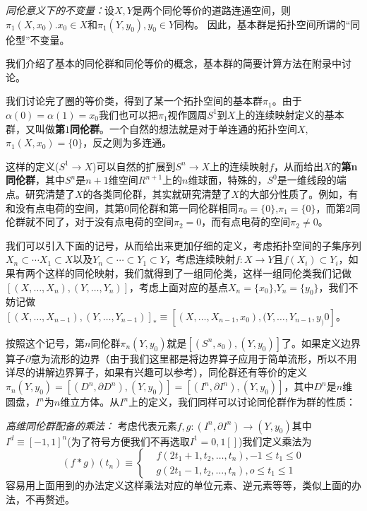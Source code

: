 \documentclass[supercite]{HustGraduPaper}
\begin{document}
\begin{appendices}
		\textit{同伦意义下的不变量：}设$X,Y$是两个同伦等价的道路连通空间，则$\pi_1(X,x_0).x_0 \in X$和$\pi_1(Y,y_0),y_0 \in Y$同构。 因此，基本群是拓扑空间所谓的“同伦型”不变量。
		
		我们介绍了基本的同伦群和同伦等价的概念，基本群的简要计算方法在附录中讨论。
		
		我们讨论完了圈的等价类，得到了某一个拓扑空间的基本群$\pi_1$。由于$\alpha(0) = \alpha(1) = x_0$我们也可以把$\pi_1$视作圆周$S^1$到$X$上的连续映射定义的基本群，又叫做\textbf{第}$1$\textbf{同伦群}。一个自然的想法就是对于单连通的拓扑空间$X$, $\pi_1(X,x_0) = \{0\}$，反之则为多连通。
		
		这样的定义($S^1 \to X$)可以自然的扩展到$S^n \to X$上的连续映射$f$，从而给出$X$的\textbf{第n同伦群}，其中$S^n$是$n+1$维空间$R^{n+1}$上的$n$维球面，特殊的，$S^0$是一维线段的端点。研究清楚了$X$的各类同伦群，其实就研究清楚了$X$的大部分性质了。例如，有和没有点电荷的空间，其第0同伦群和第一同伦群相同$\pi_0 = \{0\}$,$\pi_1 = \{0\}$，而第2同伦群就不同了，对于没有点电荷的空间$\pi_2 = {0}$，而有点电荷的空间$\pi_2 \ne 0$。
		
		我们可以引入下面的记号，从而给出来更加仔细的定义，考虑拓扑空间的子集序列$X_n \subset \cdots X_1 \subset X$以及$Y_n \subset \cdots \subset Y_1 \subset Y$，考虑连续映射$f: X \to Y$且$f(X_i) \subset Y_i$，如果有两个这样的同伦映射，我们就得到了一组同伦类，这样一组同伦类我们记做$[(X,\ldots, X_n),(Y,\ldots,Y_n)]$，考虑上面对应的基点$X_n  = \{x_0\}$,$Y_n = \{y_0\}$，我们不妨记做$[(X,\ldots, X_{n-1}),(Y,\ldots,Y_{n-1})]_* \equiv [(X,\ldots, X_{n-1},x_0),(Y,\ldots,Y_{n-1},y_)0]$。
		
		按照这个记号，第$n$同伦群$\pi_n(Y,y_0)$就是$[(S^n,s_0),(Y,y_0)]$了。如果定义边界算子$\partial$意为流形的边界（由于我们这里都是将边界算子应用于简单流形，所以不用详尽的讲解边界算子，如果有兴趣可以参考\cite{省身2001微分几何讲义}），同伦群还有等价的定义$\pi_n(Y,y_0) = [(D^n,\partial D^n),(Y,y_0)] = [(I^n, \partial I^n),(Y,y_0)]$，其中$D^n$是$n$维圆盘，$I^n$为$n$维立方体。从$I^n$上的定义，我们同样可以讨论同伦群作为群的性质：
		
		\textit{高维同伦群配备的乘法：} 考虑代表元素$f,g : (I^n,\partial I^n) \to (Y,y_0)$其中$I^d \equiv [-1,1]^n$(为了符号方便我们不再选取$I^1 = 0,1[]$)我们定义乘法为
		\begin{equation}
		(f * g)(t_n) \equiv \begin{cases}
		&f(2t_1 + 1,t_2,\ldots,t_n), -1 \le t_1 \le 0 \\
		&g(2t_1 - 1,t_2,\ldots,t_n),o \le t_1 \le 1
		\end{cases} 
		\end{equation}
		容易用上面用到的办法定义这样乘法对应的单位元素、逆元素等等，类似上面的办法，不再赘述。
		

\end{appendices}
\end{document}
